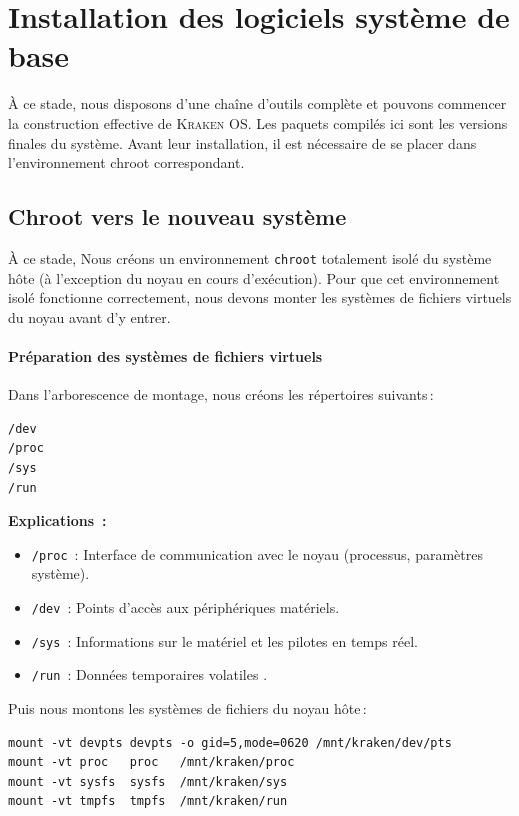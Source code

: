 \section{Installation des logiciels système de base}
\label{subsec:install-base}

À ce stade, nous disposons d’une chaîne d’outils complète et pouvons commencer la construction effective de \textsc{Kraken OS}. Les paquets compilés ici sont les versions finales du système. Avant leur installation, il est nécessaire de se placer dans l’environnement chroot correspondant.




\subsection{Chroot vers le nouveau système}
\label{sssec:chroot}

À ce stade, Nous créons un environnement \texttt{chroot} totalement isolé du système hôte (à l’exception du noyau en cours d’exécution). Pour que cet environnement isolé fonctionne correctement, nous devons monter les systèmes de fichiers virtuels du noyau avant d’y entrer.

\paragraph{Préparation des systèmes de fichiers virtuels}
Dans l’arborescence de montage, nous créons les répertoires suivants :
\begin{verbatim}
/dev
/proc
/sys
/run
\end{verbatim}

\textbf{Explications~:}
\begin{itemize}
  \item \texttt{/proc}~: Interface de communication avec le noyau (processus, paramètres système).
  \item \texttt{/dev}~: Points d’accès aux périphériques matériels.
  \item \texttt{/sys}~: Informations sur le matériel et les pilotes en temps réel.
  \item \texttt{/run}~: Données temporaires volatiles .\\
\end{itemize}
Puis nous montons les systèmes de fichiers du noyau hôte :\\

\begin{verbatim}
mount -vt devpts devpts -o gid=5,mode=0620 /mnt/kraken/dev/pts
mount -vt proc   proc   /mnt/kraken/proc
mount -vt sysfs  sysfs  /mnt/kraken/sys
mount -vt tmpfs  tmpfs  /mnt/kraken/run
\end{verbatim}


